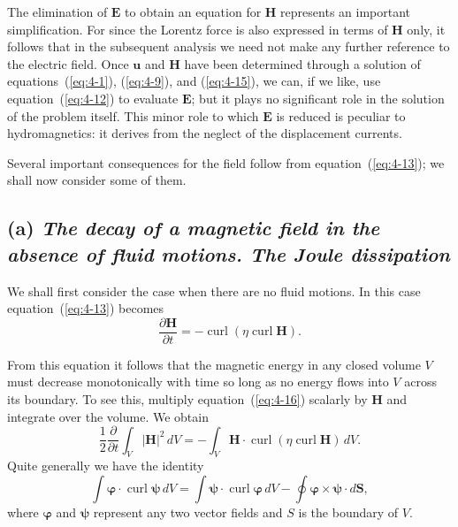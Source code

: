 The elimination of $\mathbf{E}$ to obtain an equation for $\mathbf{H}$ represents an important simplification. For since the Lorentz force is also expressed in terms of $\mathbf{H}$ only, it follows that in the subsequent analysis we need not make any further reference to the electric field. Once $\mathbf{u}$ and $\mathbf{H}$ have been determined through a solution of equations~(\ref{eq:4-1}), (\ref{eq:4-9}), and (\ref{eq:4-15}), we can, if we like, use equation~(\ref{eq:4-12}) to evaluate $\mathbf{E}$; but it plays no significant role in the solution of the problem itself. This minor role to which $\mathbf{E}$ is reduced is peculiar to hydromagnetics: it derives from the neglect of the displacement currents.

Several important consequences for the field follow from equation~(\ref{eq:4-13}); we shall now consider some of them.

\subsection*{(a) \emph{The decay of a magnetic field in the absence of fluid motions. The Joule dissipation}}

We shall first consider the case when there are no fluid motions. In this case equation~(\ref{eq:4-13}) becomes
\begin{equation}
\label{eq:4-16}
\frac{\partial\mathbf{H}}{\partial t} = -\operatorname{curl}(\eta\operatorname{curl}\mathbf{H}).
\end{equation}

From this equation it follows that the magnetic energy in any closed volume $V$ must decrease monotonically with time so long as no energy flows into $V$ across its boundary. To see this, multiply equation~(\ref{eq:4-16}) scalarly by $\mathbf{H}$ and integrate over the volume. We obtain
\begin{equation}
\label{eq:4-17}
\frac{1}{2}\frac{\partial}{\partial t}\int_V |\mathbf{H}|^2\,dV = -\int_V \mathbf{H}\cdot\operatorname{curl}(\eta\operatorname{curl}\mathbf{H})\,dV.
\end{equation}
Quite generally we have the identity
\begin{equation}
\label{eq:4-18}
\int \boldsymbol{\varphi}\cdot\operatorname{curl}\boldsymbol{\psi}\,dV = \int \boldsymbol{\psi}\cdot\operatorname{curl}\boldsymbol{\varphi}\,dV - \oint \boldsymbol{\varphi}\times\boldsymbol{\psi}\cdot d\mathbf{S},
\end{equation}
where $\boldsymbol{\varphi}$ and $\boldsymbol{\psi}$ represent any two vector fields and $S$ is the boundary of $V$.

